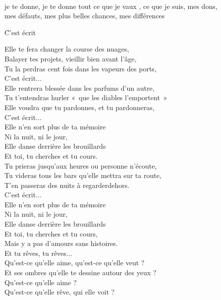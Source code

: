 \documentclass{novel}
\begin{document}
\begin{bfseries}
[5x:] \\
je te donne, je te donne tout ce que je vaux , ce que je suis, mes dons, \\
mes défauts, mes plus belles chances, mes différences
\end{bfseries}

\newpage
\normalsize

\h*{C’est écrit}

\begin{multicols}{2}
Elle te fera changer la course des nuages, \\
Balayer tes projets, vieillir bien avant l'âge, \\
Tu la perdras cent fois dans les vapeurs des ports, \\
C'est écrit... \\
Elle rentrera blessée dans les parfums d'un autre, \\
Tu t'entendras hurler «~que les diables l'emportent~» \\
Elle voudra que tu pardonnes, et tu pardonneras, \\
C'est écrit... \\
Elle n'en sort plus de ta mémoire \\
Ni la nuit, ni le jour, \\
Elle danse derrière les brouillards \\
Et toi, tu cherches et tu cours. \\
Tu prieras jusqu'aux heures ou personne n'écoute, \\
Tu videras tous les bars qu'elle mettra sur ta route, \\
T'en passeras des nuits à regarderdehors. \\
C'est écrit... \\
Elle n'en sort plus de ta mémoire \\
Ni la nuit, ni le jour, \\
Elle danse derrière les brouillards \\
Et toi, tu cherches et tu cours, \\
Mais y a pas d'amours sans histoires. \\
Et tu rêves, tu rêves... \\
Qu'est-ce qu'elle aime, qu'est-ce qu'elle veut ? \\
Et ses ombres qu'elle te dessine autour des yeux ? \\
Qu'est-ce qu'elle aime ? \\
Qu'est-ce qu'elle rêve, qui elle voit ? \\

\end{multicols}
\end{document}
